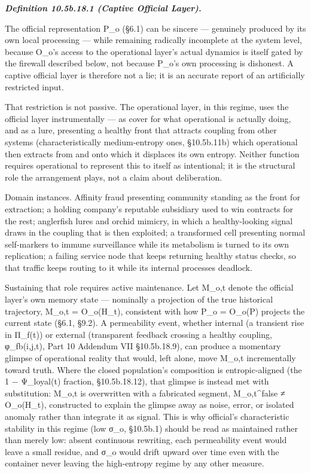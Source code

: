 \documentclass[
]{article}
\begin{document}
\emph{\textbf{Definition 10.5b.18.1 (Captive Official Layer).}}

The official representation P\_o (§6.1) can be sincere --- genuinely
produced by its own local processing --- while remaining radically
incomplete at the system level, because O\_o's access to the operational
layer's actual dynamics is itself gated by the firewall described below,
not because P\_o's own processing is dishonest. A captive official layer
is therefore not a lie; it is an accurate report of an artificially
restricted input.

That restriction is not passive. The operational layer, in this regime,
uses the official layer instrumentally --- as cover for what operational
is actually doing, and as a lure, presenting a healthy front that
attracts coupling from other systems (characteristically medium-entropy
ones, §10.5b.11b) which operational then extracts from and onto which it
displaces its own entropy. Neither function requires operational to
represent this to itself as intentional; it is the structural role the
arrangement plays, not a claim about deliberation.

Domain instances. Affinity fraud presenting community standing as the
front for extraction; a holding company's reputable subsidiary used to
win contracts for the rest; anglerfish lures and orchid mimicry, in
which a healthy-looking signal draws in the coupling that is then
exploited; a transformed cell presenting normal self-markers to immune
surveillance while its metabolism is turned to its own replication; a
failing service node that keeps returning healthy status checks, so that
traffic keeps routing to it while its internal processes deadlock.

Sustaining that role requires active maintenance. Let M\_o,t denote the
official layer's own memory state --- nominally a projection of the true
historical trajectory, M\_o,t = O\_o(H\_t), consistent with how P\_o =
O\_o(P) projects the current state (§6.1, §9.2). A permeability event,
whether internal (a transient rise in Π\_f(t)) or external (transparent
feedback crossing a healthy coupling, φ\_fb(i,j,t), Part 10 Addendum VII
§10.5b.18.9), can produce a momentary glimpse of operational reality
that would, left alone, move M\_o,t incrementally toward truth. Where
the closed population's composition is entropic-aligned (the 1 −
Ψ\_loyal(t) fraction, §10.5b.18.12), that glimpse is instead met with
substitution: M\_o,t is overwritten with a fabricated segment,
M\_o,t\^{}false ≠ O\_o(H\_t), constructed to explain the glimpse away as
noise, error, or isolated anomaly rather than integrate it as signal.
This is why official's characteristic stability in this regime (low
σ\_o, §10.5b.1) should be read as maintained rather than merely low:
absent continuous rewriting, each permeability event would leave a small
residue, and σ\_o would drift upward over time even with the container
never leaving the high-entropy regime by any other measure.
\end{document}
